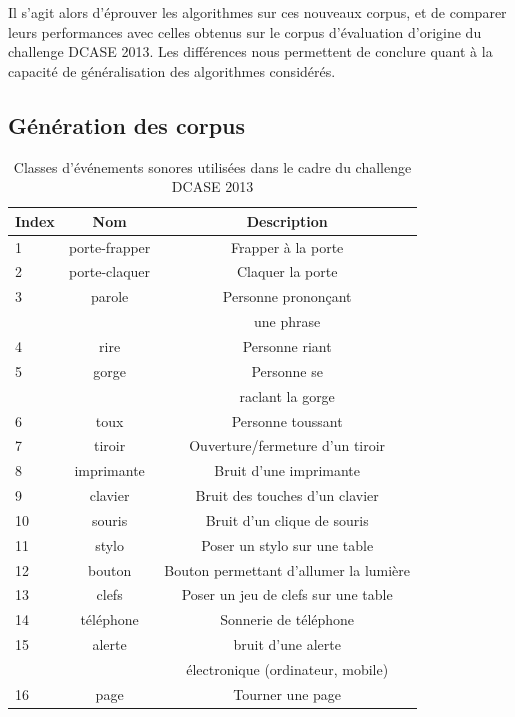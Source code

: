 Il s'agit alors d'éprouver les algorithmes sur ces nouveaux corpus, et de comparer leurs performances avec celles obtenus sur le corpus d'évaluation d'origine du challenge DCASE 2013. Les différences nous permettent de conclure quant à la capacité de généralisation des algorithmes considérés.

\subsection{Génération des corpus}

\begin{table}[t]
\begin{center}
\begin{tabular}{lcc}
\textbf{Index} & \textbf{Nom}  & \textbf{Description}  \\ 
\hline
1   & porte-frapper & Frapper à la porte \\
2   & porte-claquer & Claquer la porte \\
3   & parole        & Personne  prononçant \\
    &               &  une phrase \\
4   & rire          & Personne riant  \\    
5   & gorge         & Personne se   \\
    &               & raclant la gorge \\
6   & toux          & Personne toussant \\
7   & tiroir        & Ouverture/fermeture d'un tiroir \\
8   & imprimante    & Bruit d'une imprimante \\
9   & clavier       & Bruit des touches d'un clavier \\
10  & souris        & Bruit d'un clique de souris \\
11  & stylo         & Poser un stylo sur une table \\
12  & bouton        & Bouton permettant d'allumer la lumière \\
13  & clefs         & Poser un jeu de clefs sur une table \\    
14  & téléphone     & Sonnerie de téléphone \\
15  & alerte        & bruit d'une alerte \\
    &               & électronique  (ordinateur, mobile) \\
16  & page          & Tourner une page \\     
\hline      
\end{tabular}
\end{center}
\caption{Classes d'événements sonores utilisées dans le cadre du challenge DCASE 2013}
\label{tab:eventDCASE2013}
\end{table}

